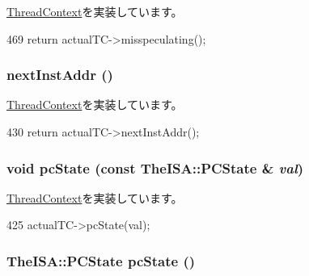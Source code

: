 \hyperlink{classThreadContext_a6b21c2b589ae3065643986e1c3e5f6fa}{ThreadContext}を実装しています。


\begin{DoxyCode}
469 { return actualTC->misspeculating(); }
\end{DoxyCode}
\hypertarget{classProxyThreadContext_aceec6e28772f91b3cc921c0e3927b0c2}{
\subsubsection[{nextInstAddr}]{ nextInstAddr ()}}
\label{classProxyThreadContext_aceec6e28772f91b3cc921c0e3927b0c2}


\hyperlink{classThreadContext_a01377ccfda419abf5f6ff7730c9eaac9}{ThreadContext}を実装しています。


\begin{DoxyCode}
430 { return actualTC->nextInstAddr(); }
\end{DoxyCode}
\hypertarget{classProxyThreadContext_a5e9cfc754c9ef9b7db875ce89871944e}{
\subsubsection[{pcState}]{\setlength{\rightskip}{0pt plus 5cm}void pcState (const TheISA::PCState \& {\em val})}}
\label{classProxyThreadContext_a5e9cfc754c9ef9b7db875ce89871944e}


\hyperlink{classThreadContext_a8f9949be84d3a2db4137f9e49ce32952}{ThreadContext}を実装しています。


\begin{DoxyCode}
425 { actualTC->pcState(val); }
\end{DoxyCode}
\hypertarget{classProxyThreadContext_a827fb3454585cf4c620f4fd341966317}{
\subsubsection[{pcState}]{\setlength{\rightskip}{0pt plus 5cm}TheISA::PCState pcState ()}}
\label{classProxyThreadContext_a827fb3454585cf4c620f4fd341966317}


